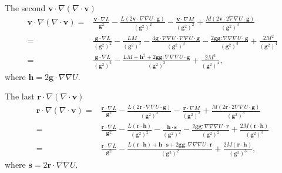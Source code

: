 \documentclass{article}
\begin{document}
The second $\mathbf v \cdot \nabla (\nabla \cdot \mathbf v)$
\begin{align*}
\mathbf v \cdot \nabla (\nabla \cdot \mathbf v)
    = &  \frac { \mathbf v \cdot \nabla L }
              { \mathbf g^2 }
      - \frac { L (2 \mathbf v \cdot \nabla \nabla U \cdot \mathbf g) }
              { (\mathbf g^2)^2 }
     - \frac { \mathbf v \cdot \nabla M }
              { (\mathbf g^2)^2 } 
      + \frac { M (2 \mathbf v \cdot 2 \nabla \nabla U \cdot \mathbf g)}
              { (\mathbf g^2)^3 } 
\\
   = & \frac { \mathbf g \cdot \nabla L }
              { (\mathbf g^2)^2 }
      - \frac { L M }
              { (\mathbf g^2)^3 }
     - \frac { 4 \mathbf g \cdot \nabla \nabla U \cdot \nabla \nabla U \cdot \mathbf g }
              { (\mathbf g^2)^3 } 
      - \frac { 2 \mathbf g \mathbf g : \nabla \nabla \nabla U \cdot \mathbf g }
              { (\mathbf g^2)^3 } 
      + \frac { 2 M^2}
              { (\mathbf g^2)^4 } 
\\
   = & \frac { \mathbf g \cdot \nabla L }
              { (\mathbf g^2)^2 }
     - \frac { L M + \mathbf h^2  + 2 \mathbf g \mathbf g : \nabla \nabla \nabla U \cdot \mathbf g}
              { (\mathbf g^2)^3 } 
      + \frac { 2 M^2}
              { (\mathbf g^2)^4 },
\end{align*}
where $\mathbf h = 2 \mathbf g \cdot \nabla \nabla U$.

The last $\mathbf r \cdot \nabla (\nabla \cdot \mathbf v)$
\begin{align*}
\mathbf r \cdot \nabla (\nabla \cdot \mathbf v)
    = &  \frac { \mathbf r \cdot \nabla L }
              { \mathbf g^2 }
      - \frac { L (2 \mathbf r \cdot \nabla \nabla U \cdot \mathbf g) }
              { (\mathbf g^2)^2 }
     - \frac { \mathbf r \cdot \nabla M }
              { (\mathbf g^2)^2 } 
      + \frac { M (2 \mathbf r \cdot 2 \nabla \nabla U \cdot \mathbf g)}
              { (\mathbf g^2)^3 } 
\\
   = & \frac { \mathbf r \cdot \nabla L }
              { \mathbf g^2 }
      - \frac { L (\mathbf r \cdot \mathbf h) }
              { (\mathbf g^2)^2 }
     - \frac { \mathbf h \cdot \mathbf s }
              { (\mathbf g^2)^2 } 
      - \frac { 2 \mathbf g \mathbf g : \nabla \nabla \nabla U \cdot \mathbf r }
              { (\mathbf g^2)^2 } 
      + \frac { 2 M (\mathbf r \cdot \mathbf h)}
              { (\mathbf g^2)^3 } 
\\
   = & \frac { \mathbf r \cdot \nabla L }
              { \mathbf g^2 }
     - \frac { L (\mathbf r \cdot \mathbf h) + \mathbf h \cdot \mathbf s + 2 \mathbf g \mathbf g : \nabla \nabla \nabla U \cdot \mathbf r}
              { (\mathbf g^2)^2 }
      + \frac { 2 M (\mathbf r \cdot \mathbf h)}
              { (\mathbf g^2)^3 },
\end{align*}
where $\mathbf s = 2 \mathbf r \cdot \nabla \nabla U$.
\end{document}
